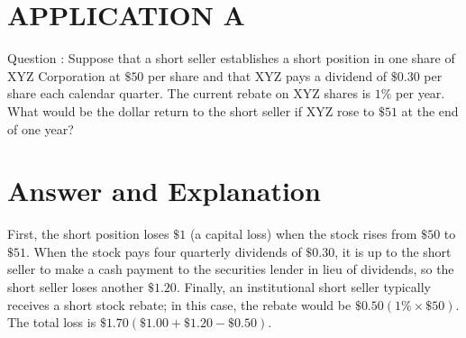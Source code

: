 \documentclass[11pt]{article}
\begin{document}
\section*{APPLICATION A}
Question : Suppose that a short seller establishes a short position in one share of XYZ Corporation at $\$ 50$ per share and that XYZ pays a dividend of $\$ 0.30$ per share each calendar quarter. The current rebate on XYZ shares is $1 \%$ per year. What would be the dollar return to the short seller if XYZ rose to $\$ 51$ at the end of one year?

\section*{Answer and Explanation}
First, the short position loses $\$ 1$ (a capital loss) when the stock rises from $\$ 50$ to $\$ 51$. When the stock pays four quarterly dividends of $\$ 0.30$, it is up to the short seller to make a cash payment to the securities lender in lieu of dividends, so the short seller loses another $\$ 1.20$. Finally, an institutional short seller typically receives a short stock rebate; in this case, the rebate would be $\$ 0.50(1 \% \times \$ 50)$. The total loss is $\$ 1.70(\$ 1.00+\$ 1.20-\$ 0.50)$.
\end{document}

